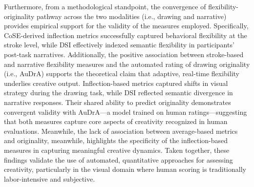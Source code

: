 \documentclass[../MA_Thesis.tex]{subfiles}
\begin{document}
Furthermore, from a methodological standpoint, the convergence of flexibility-originality pathway across the two modalities (i.e., drawing and narrative) provides empirical support for the validity of the measures employed. Specifically, CoSE-derived inflection metrics successfully captured behavioral flexibility at the stroke level, while DSI effectively indexed semantic flexibility in participants’ post-task narratives. Additionally, the positive association between stroke-based and narrative flexibility measures and the automated rating of drawing originality (i.e., AuDrA) supports the theoretical claim that adaptive, real-time flexibility underlies creative output. Inflection-based metrics captured shifts in visual strategy during the drawing task, while DSI reflected semantic divergence in narrative responses. Their shared ability to predict originality demonstrates convergent validity with AuDrA—a model trained on human ratings—suggesting that both measures capture core aspects of creativity recognized in human evaluations. Meanwhile, the lack of association between average-based metrics and originality, meanwhile, highlights the specificity of the inflection-based measures in capturing meaningful creative dynamics. Taken together, these findings validate the use of automated, quantitative approaches for assessing creativity, particularly in the visual domain where human scoring is traditionally labor-intensive and subjective.
\end{document}
